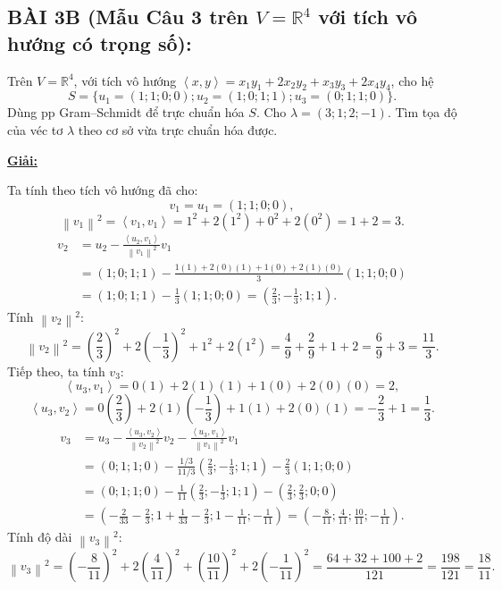 \documentclass[12pt,a4paper]{article}
\newcommand{\R}{\mathbb{R}}
\newcommand{\ip}[2]{\left\langle #1,#2\right\rangle}
\newcommand{\norm}[1]{\left\|#1\right\|}
\begin{document}
\vspace{0.3cm}

\subsection*{BÀI 3B (Mẫu Câu 3 trên $V = \R^4$ với tích vô hướng có trọng số):}
Trên $V=\R^4$, với tích vô hướng $\ip{x}{y} = x_1y_1 + 2x_2y_2 + x_3y_3 + 2x_4y_4$, cho hệ
\[
S=\{u_1=(1; 1; 0; 0); u_2=(1; 0; 1; 1); u_3=(0; 1; 1; 0)\}.
\]
Dùng pp Gram--Schmidt để trực chuẩn hóa $S$.
Cho $\lambda = (3; 1; 2; -1)$. Tìm tọa độ của véc tơ $\lambda$ theo cơ sở vừa trực chuẩn hóa được.

\underline{\textbf{Giải:}}

Ta tính theo tích vô hướng đã cho:
\[
v_1 = u_1 = (1; 1; 0; 0),
\]
\[
\norm{v_1}^2 = \ip{v_1}{v_1} = 1^2 + 2(1^2) + 0^2 + 2(0^2) = 1 + 2 = 3.
\]
\begin{align*}
v_2 &= u_2 - \frac{\ip{u_2}{v_1}}{\norm{v_1}^2}v_1 \\
    &= (1; 0; 1; 1) - \frac{1(1) + 2(0)(1) + 1(0) + 2(1)(0)}{3}(1; 1; 0; 0) \\
    &= (1; 0; 1; 1) - \frac{1}{3}(1; 1; 0; 0) = \left(\frac{2}{3}; -\frac{1}{3}; 1; 1\right).
\end{align*}
Tính $\norm{v_2}^2$:
\[
\norm{v_2}^2 = \left(\frac{2}{3}\right)^2 + 2\left(-\frac{1}{3}\right)^2 + 1^2 + 2(1^2) = \frac{4}{9} + \frac{2}{9} + 1 + 2 = \frac{6}{9} + 3 = \frac{11}{3}.
\]
Tiếp theo, ta tính $v_3$:
\[
\ip{u_3}{v_1} = 0(1) + 2(1)(1) + 1(0) + 2(0)(0) = 2,
\]
\[
\ip{u_3}{v_2} = 0\left(\frac{2}{3}\right) + 2(1)\left(-\frac{1}{3}\right) + 1(1) + 2(0)(1) = -\frac{2}{3} + 1 = \frac{1}{3}.
\]
\begin{align*}
v_3 &= u_3 - \frac{\ip{u_3}{v_2}}{\norm{v_2}^2}v_2 - \frac{\ip{u_3}{v_1}}{\norm{v_1}^2}v_1 \\
    &= (0; 1; 1; 0) - \frac{1/3}{11/3}\left(\frac{2}{3}; -\frac{1}{3}; 1; 1\right) - \frac{2}{3}(1; 1; 0; 0) \\
    &= (0; 1; 1; 0) - \frac{1}{11}\left(\frac{2}{3}; -\frac{1}{3}; 1; 1\right) - \left(\frac{2}{3}; \frac{2}{3}; 0; 0\right) \\
    &= \left(-\frac{2}{33} - \frac{2}{3}; 1 + \frac{1}{33} - \frac{2}{3}; 1 - \frac{1}{11}; -\frac{1}{11}\right) = \left(-\frac{8}{11}; \frac{4}{11}; \frac{10}{11}; -\frac{1}{11}\right).
\end{align*}
Tính độ dài $\norm{v_3}^2$:
\[
\norm{v_3}^2 = \left(-\frac{8}{11}\right)^2 + 2\left(\frac{4}{11}\right)^2 + \left(\frac{10}{11}\right)^2 + 2\left(-\frac{1}{11}\right)^2 = \frac{64 + 32 + 100 + 2}{121} = \frac{198}{121} = \frac{18}{11}.
\]
\end{document}
